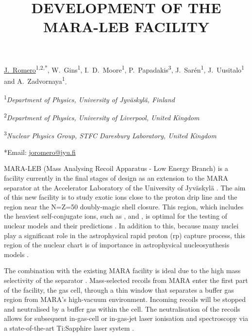 \documentclass[12pt, a4paper]{article}
\begin{document}

\title{DEVELOPMENT OF THE MARA-LEB FACILITY}

{\underline{J.~Romero}\textsuperscript{1,2,*}, W.~Gins\textsuperscript{1}, I.~D.~Moore\textsuperscript{1}, P.~Papadakis\textsuperscript{3}, J.~Sarén\textsuperscript{1}, J.~Uusitalo\textsuperscript{1} and A.~Zadvornaya\textsuperscript{1}}.

{\textsuperscript{1}\em Department of Physics, University of Jyväskylä, Finland}

{\textsuperscript{2}\em Department of Physics, University of Liverpool, United Kingdom}

{\textsuperscript{3}\em Nuclear Physics Group, STFC Daresbury Laboratory, United Kingdom}

*Email: \href{mailto:joromero@jyu.fi}{{joromero@jyu.fi}}

\vspace{2\baselineskip}


MARA-LEB (Mass Analysing Recoil Apparatus - Low Energy Branch) is a facility currently in the final stages of design as an extension to the MARA separator at the Accelerator Laboratory of the University of Jyväskylä \cite{MARA}. The aim of this new facility is to study exotic ions close to the proton drip line and the region near the N=Z=50 doubly-magic shell closure. This region, which includes the heaviest self-conjugate ions, such as ,  and  , is optimal for the testing of nuclear models and their predictions \cite{theo}. In addition to this, because many nuclei play a significant role in the astrophysical rapid proton (rp) capture process, this region of the nuclear chart is of importance in astrophysical nucleosynthesis models \cite{astro}. 

The combination with the existing MARA facility is ideal due to the high mass selectivity of the separator \cite{josh}. Mass-selected recoils from MARA enter the first part of the facility, the gas cell, through a thin window that separates a buffer gas region from MARA's high-vacuum environment. Incoming recoils will be stopped and neutralised by a buffer gas within the cell. The neutralisation of the recoils allows for subsequent in-gas-cell or in-gas-jet laser ionisation and spectroscopy via a state-of-the-art Ti:Sapphire laser system \cite{conf}.  
\end{document}
